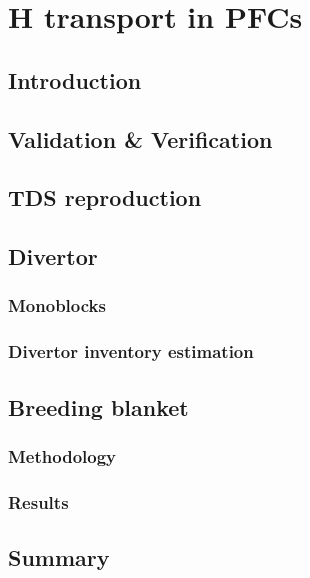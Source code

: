 \chapter{H transport in PFCs} \label{Chapter3}

\section{Introduction}

\section{Validation \& Verification}

\section{TDS reproduction}


\section{Divertor}
\subsection{Monoblocks}


\subsection{Divertor inventory estimation}


\section{Breeding blanket}
\subsection{Methodology}
\subsection{Results}
\section{Summary}